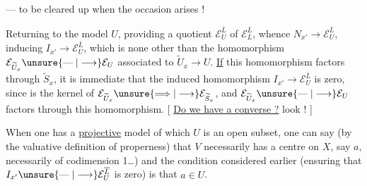 --- to be cleared up when the occasion arises !

Returning to the model $U$, providing a quotient $\mathcal E_U^{\overline L}$ of $\mathcal E_L^{\overline L}$, whence $N_{x'}\longrightarrow\mathcal E_U^{\overline L}$, inducing $I_{x'}\longrightarrow\mathcal E_U^{\overline L}$,
which is none other than the homomorphism \unsure{---} $\mathcal E_{\widetilde U_x}\unsure{\mathrel{\text{---}}|\longrightarrow}\mathcal E_U$ associated to $\widetilde U_x\longrightarrow U$. \uline{If} this homomorphism factors through $\widetilde S_x$, it is immediate that the induced homomorphism $I_{x'}\longrightarrow\mathcal E_U^{\overline L}$ is zero, since   is the kernel of $\mathcal E_{\widetilde U_x}\unsure{\Longrightarrow|\longrightarrow}\mathcal E_{\widetilde S_x}$, and $\mathcal E_{\widetilde U_x}\unsure{\mathrel{\text{---}}|\longrightarrow}\mathcal E_U$ factors through this homomorphism.
[ \uline{Do we have a converse ?} look ! ]

When one has a \uline{projective} model of which $U$ is an open subset, one can say (by the valuative definition of properness) that $V$ necessarily has a centre on $X$, say $a$,   necessarily of codimension 1\ldots) and the condition considered earlier (ensuring that $I_{x'}\unsure{\mathrel{\text{---}}|\longrightarrow}\mathcal E_U^{\overline L}$ is zero) is that $a\in U$.
